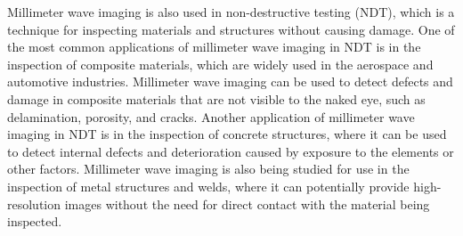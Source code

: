 \documentclass[11pt, oneside]{article}   	%
\begin{document}
Millimeter wave imaging is also used in non-destructive testing (NDT), which is a technique for inspecting materials and structures without causing damage. One of the most common applications of millimeter wave imaging in NDT is in the inspection of composite materials, which are widely used in the aerospace and automotive industries. Millimeter wave imaging can be used to detect defects and damage in composite materials that are not visible to the naked eye, such as delamination, porosity, and cracks. Another application of millimeter wave imaging in NDT is in the inspection of concrete structures, where it can be used to detect internal defects and deterioration caused by exposure to the elements or other factors. Millimeter wave imaging is also being studied for use in the inspection of metal structures and welds, where it can potentially provide high-resolution images without the need for direct contact with the material being inspected.
\end{document}
